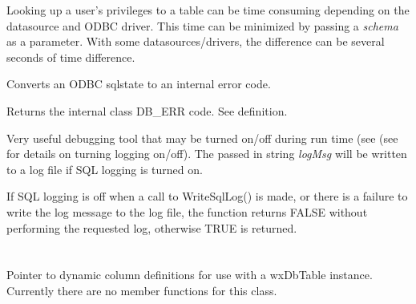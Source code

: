 Looking up a user's privileges to a table can be time consuming depending on the 
datasource and ODBC driver.  This time can be minimized by passing a {\it schema} 
as a parameter.  With some datasources/drivers, the difference can be several 
seconds of time difference.


\label{wxdbtranslatesqlstate}


Converts an ODBC sqlstate to an internal error code.




Returns the internal class DB_ERR code.  See  definition.


\label{wxdbwritesqllog}





Very useful debugging tool that may be turned on/off during run time (see 
(see  for details on 
turning logging on/off).  The passed in string {\it logMsg} will be written to 
a log file if SQL logging is turned on.


If SQL logging is off when a call to WriteSqlLog() is made, or there is a
failure to write the log message to the log file, the function returns
FALSE without performing the requested log, otherwise TRUE is returned.




\section{}\label{wxdbcoldataptr}

Pointer to dynamic column definitions for use with a wxDbTable instance.  
Currently there are no member functions for this class.

